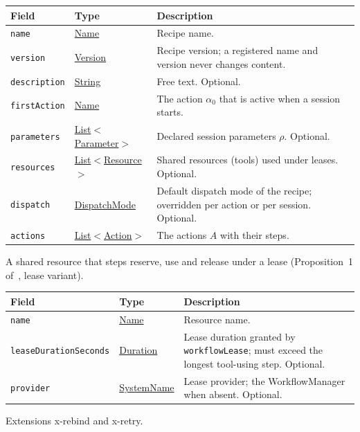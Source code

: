 \documentclass[a4paper]{arrowhead}
\newcommand{\mref}[1]{{\textcolor{ArrowheadPurple}{\hyperref[sec:model:#1]{#1}}}}
\newcommand{\pref}[1]{{\textcolor{ArrowheadGrey}{\hyperref[sec:model:primitives:#1]{#1}}}}
\begin{document}
{\small
\begin{longtable}{|p{3.9cm}|p{4.4cm}|p{7.5cm}|}

\hline
\rowcolor{gray!33} Field & Type & Description \\ \hline
\endhead
\texttt{name} & \pref{Name} & Recipe name. \\ \hline
\texttt{version} & \pref{Version} & Recipe version; a registered name and version never changes content. \\ \hline
\texttt{description} & \pref{String} & Free text. Optional. \\ \hline
\texttt{firstAction} & \pref{Name} & The action $\alpha_0$ that is active when a session starts. \\ \hline
\texttt{parameters} & \pref{List}$<$\mref{Parameter}$>$ & Declared session parameters $\rho$. Optional. \\ \hline
\texttt{resources} & \pref{List}$<$\mref{Resource}$>$ & Shared resources (tools) used under leases. Optional. \\ \hline
\texttt{dispatch} & \mref{DispatchMode} & Default dispatch mode of the recipe; overridden per action or per session. Optional. \\ \hline
\texttt{actions} & \pref{List}$<$\mref{Action}$>$ & The actions $A$ with their steps. \\ \hline
\end{longtable}
}

A shared resource that steps reserve, use and release under a lease (Proposition~1 of~\cite{varga2026}, lease variant).

{\small
\begin{longtable}{|p{3.9cm}|p{4.4cm}|p{7.5cm}|}

\hline
\rowcolor{gray!33} Field & Type & Description \\ \hline
\endhead
\texttt{name} & \pref{Name} & Resource name. \\ \hline
\texttt{lease\allowbreak{}Duration\allowbreak{}Seconds} & \pref{Duration} & Lease duration granted by \texttt{workflowLease}; must exceed the longest tool-using step. Optional. \\ \hline
\texttt{provider} & \pref{SystemName} & Lease provider; the WorkflowManager when absent. Optional. \\ \hline
\end{longtable}
}

Extensions x-rebind and x-retry.
\end{document}
